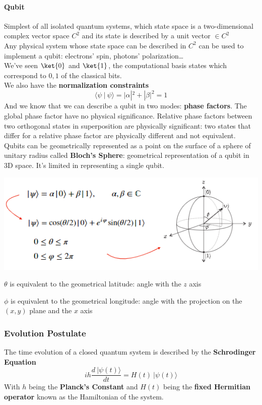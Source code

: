 \documentclass[10pt]{report}
\begin{document}
\paragraph{Qubit} Simplest of all isolated quantum systems, which state space is a two-dimensional complex vector space $C^2$ and its state is described by a unit vector $\in C^2$\\
Any physical system whose state space can be described in $C^2$ can be used to implement a qubit: electrons' spin, photons' polarization\ldots\\
We've seen $\ket{0}$ and $\ket{1}$, the computational basis states which correspond to $0,1$ of the classical bits.\\
We also have the \textbf{normalization constraints} $$\langle\psi\:|\:\psi\rangle = |\alpha|^2+|\beta|^2 = 1$$
And we know that we can describe a qubit in two modes: \textbf{phase factors}. The global phase factor have no physical significance. Relative phase factors between two orthogonal states in superposition are physically significant: two states that differ for a relative phase factor are physically different and not equivalent.\\
Qubits can be geometrically represented as a point on the surface of a sphere of unitary radius called \textbf{Bloch's Sphere}: geometrical representation of a qubit in 3D space. It's limited in representing a single qubit.
\begin{center}
	\includegraphics[scale=0.75]{13.png}
\end{center}
\begin{list}{}{}
	\item $\theta$ is equivalent to the geometrical latitude: angle with the $z$ axis
	\item $\phi$ is equivalent to the geometrical longitude: angle with the projection on the $(x,y)$ plane and the $x$ axis
\end{list}
\subsubsection{Evolution Postulate}
The time evolution of a closed quantum system is described by the \textbf{Schrodinger Equation} $$ih\frac{d\:|\psi(t)\rangle}{dt} = H(t)\:|\psi(t)\rangle$$
With $h$ being the \textbf{Planck's Constant} and $H(t)$ being the \textbf{fixed Hermitian operator} known as the Hamiltonian of the system.
\end{document}

